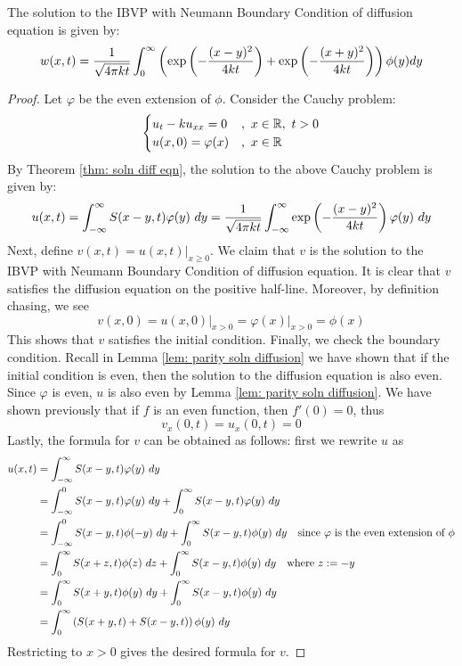 \begin{lem}
    The solution to the IBVP with Neumann Boundary Condition of diffusion equation is given by:
    \[w(x,t) = \frac{1}{\sqrt{4\pi k t}} \int_0^\infty \left(\exp\left(-\frac{(x-y)^2}{4kt}\right) + \exp\left(-\frac{(x+y)^2}{4kt}\right)\right) \phi(y) dy\]
\end{lem}
\begin{proof}
    Let $\varphi$ be the even extension of $\phi$. Consider the Cauchy problem:
    \[\begin{cases}
        u_t - ku_{xx} = 0 &,\ x\in {\mathbb R},\ t>0\\
        u(x,0) = \varphi(x) &,\ x\in {\mathbb R} 
    \end{cases}\]
    By Theorem \ref{thm: soln diff eqn}, the solution to the above Cauchy problem is given by:
    \[u(x,t) = \int_{-\infty}^{\infty} S(x-y,t)\varphi(y)\ dy = \frac{1}{\sqrt{4\pi k t}} \int_{-\infty}^\infty \exp\left(-\frac{(x-y)^2}{4kt}\right) \varphi(y)\ dy\]
    Next, define $v(x,t) = u(x,t)\vert_{x\geq 0}$. We claim that $v$ is the solution to the IBVP with Neumann Boundary Condition of diffusion equation. It is clear that $v$ satisfies the diffusion equation on the positive half-line. Moreover, by definition chasing, we see 
    \[v(x,0)=u(x,0)\vert_{x>0} = \varphi(x)\vert_{x>0}=\phi(x)\]
    This shows that $v$ satisfies the initial condition. Finally, we check the boundary condition. Recall in Lemma \ref{lem: parity soln diffusion} we have shown that if the initial condition is even, then the solution to the diffusion equation is also even. Since $\varphi$ is even, $u$ is also even by Lemma \ref{lem: parity soln diffusion}. We have shown previously that if $f$ is an even function, then $f'(0)=0$, thus
    \[v_x(0,t) = u_x(0,t) =0\]
    Lastly, the formula for $v$ can be obtained as follows: first we rewrite $u$ as
    \begin{align*}
        u(x,t) &= \int_{-\infty}^{\infty} S(x-y,t)\varphi(y)\ dy\\
        &= \int_{-\infty}^0 S(x-y,t)\varphi(y)\ dy + \int_0^\infty S(x-y,t)\varphi(y)\ dy\\
        &= \int_{-\infty}^0 S(x-y,t)\phi(-y)\ dy + \int_0^\infty S(x-y,t)\phi(y)\ dy \quad \text{since $\varphi$ is the even extension of $\phi$}\\
        &= \int_0^{\infty} S(x+z,t)\phi(z)\ dz + \int_0^\infty S(x-y,t)\phi(y)\ dy \quad \text{where } z := -y\\
        &= \int_0^{\infty} S(x+y,t)\phi(y)\ dy + \int_0^\infty S(x-y,t)\phi(y)\ dy \\
        &= \int_0^{\infty} \left(S(x+y,t) + S(x-y,t)\right)\phi(y)\ dy
    \end{align*}
    Restricting to $x> 0$ gives the desired formula for $v$.
\end{proof}

